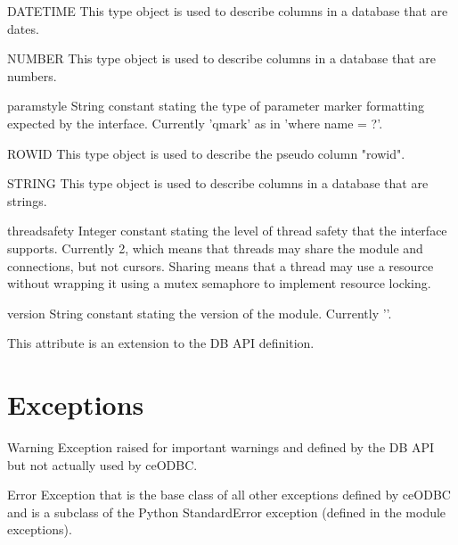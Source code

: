 \documentclass{manual}
\begin{document}
\begin{datadesc}{DATETIME}
  This type object is used to describe columns in a database that are dates.
\end{datadesc}

\begin{datadesc}{NUMBER}
  This type object is used to describe columns in a database that are numbers.
\end{datadesc}

\begin{datadesc}{paramstyle}
  String constant stating the type of parameter marker formatting expected by
  the interface. Currently 'qmark' as in 'where name = ?'.
\end{datadesc}

\begin{datadesc}{ROWID}
  This type object is used to describe the pseudo column "rowid".
\end{datadesc}

\begin{datadesc}{STRING}
  This type object is used to describe columns in a database that are strings.
\end{datadesc}

\begin{datadesc}{threadsafety}
  Integer constant stating the level of thread safety that the interface
  supports. Currently 2, which means that threads may share the module and
  connections, but not cursors. Sharing means that a thread may use a resource
  without wrapping it using a mutex semaphore to implement resource locking.
\end{datadesc}

\begin{datadesc}{version}
  String constant stating the version of the module. Currently '\version{}'.

   This attribute is an extension to the DB API definition.
\end{datadesc}

\section{Exceptions}

\begin{datadesc}{Warning}
  Exception raised for important warnings and defined by the DB API but not
  actually used by ceODBC.
\end{datadesc}

\begin{datadesc}{Error}
  Exception that is the base class of all other exceptions defined by
  ceODBC and is a subclass of the Python StandardError exception (defined in
  the module exceptions).
\end{datadesc}
\end{document}
